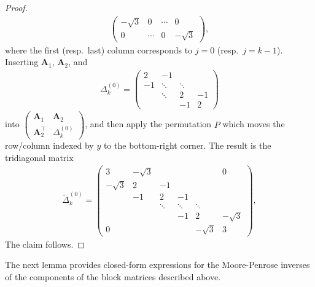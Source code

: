 \documentclass[11pt,a4paper]{amsart}
\begin{document}
\begin{proof}
\begin{align*}
\begin{pmatrix}
                -\sqrt3 & 0 &\cdots &0\\
                0&\cdots &0 &-\sqrt3
                \end{pmatrix},
        \end{align*}
    where the first (resp.\ last) column corresponds to $j=0$
    (resp.\ $j=k-1$). Inserting $\mathbf{A}_1$, $\mathbf{A}_2$, and
        \begin{align*}
            \Delta_k^{(0)}=\begin{pmatrix}
                2&-1\\[2pt]-1&\ddots&\ddots\\
                &\ddots&2&-1\\
                &&-1&2
                \end{pmatrix}
        \end{align*}
    into $\begin{pmatrix}\mathbf{A}_1&\mathbf{A}_2\\[2pt]\mathbf{A}_2^{\top}&\Delta_k^{(0)}\end{pmatrix}$, and then apply the permutation $P$ which moves the row/column indexed by $y$ to the bottom-right corner.  The result is the tridiagonal matrix
        \begin{align*}
            \widetilde{\Delta}_k^{(0)}=
            \begin{pmatrix}
            3 & -\sqrt3 &        &        &        & 0  \\
            -\sqrt3 & 2 & -1     &        &        &    \\
                    & -1 & 2 & -1&        &        \\
                    &    & \ddots & \ddots & \ddots &   \\
                    &    &        & -1 & 2 & -\sqrt3 \\
            0       &    &        &    & -\sqrt3 & 3
            \end{pmatrix},
        \end{align*}
    The claim follows.
\end{proof}

The next lemma provides closed-form expressions for the Moore-Penrose inverses of the components of the block matrices described above.
\end{document}
